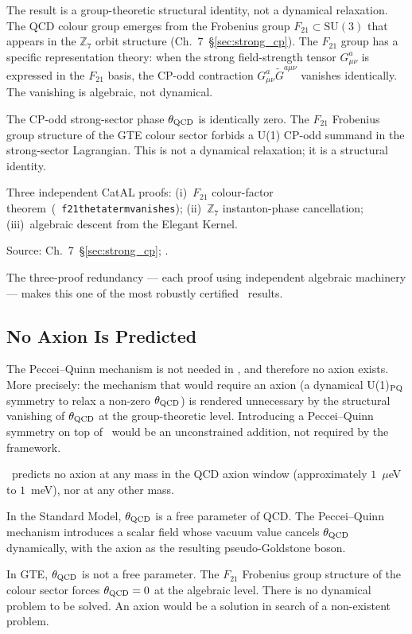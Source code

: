 \documentclass[11pt,openany]{book}
\theoremstyle{remark}
\newcommand{\GTE}{\text{GTE}}
\newcommand{\ZS}{\mathbb{Z}_7}
\newcommand{\lean}[1]{%
  \penalty-100
  \begingroup\def\_{\textunderscore\allowbreak}\texttt{#1}\endgroup}
\newcommand{\CatAL}{\ensuremath{\textbf{A}_{\rm Lean}}}
\begin{document}
The result is a group-theoretic structural identity, not a dynamical relaxation.  The
QCD colour group emerges from the Frobenius group $F_{21} \subset \mathrm{SU}(3)$ that
appears in the $\ZS$ orbit structure (Ch.~7~\S\ref{sec:strong_cp}).  The $F_{21}$ group
has a specific representation theory: when the strong field-strength tensor $G^a_{\mu\nu}$
is expressed in the $F_{21}$ basis, the CP-odd contraction $G^a_{\mu\nu}\tilde{G}^{a\mu\nu}$
vanishes identically.  The vanishing is algebraic, not dynamical.

\begin{tcolorbox}[colback=orange!5,colframe=orange!60,
  title={Result: $\theta_{\rm QCD} = 0$ Exactly (ROBUST \CatAL)}]
The CP-odd strong-sector phase $\theta_{\rm QCD}$ is identically zero.  The $F_{21}$
Frobenius group structure of the GTE colour sector forbids a U(1) CP-odd summand in
the strong-sector Lagrangian.  This is not a dynamical relaxation; it is a structural
identity.

Three independent CatAL proofs:
(i)~$F_{21}$ colour-factor theorem~\mbox{(\lean{f21\_theta\_term\_vanishes})};
(ii)~$\ZS$ instanton-phase cancellation;
(iii)~algebraic descent from the Elegant Kernel.

Source: Ch.~7~\S\ref{sec:strong_cp}; \cite{SpivackGTEQCDStructure}.
\end{tcolorbox}

The three-proof redundancy --- each proof using independent algebraic machinery ---
makes this one of the most robustly certified \GTE\ results.

\subsection*{No Axion Is Predicted}

The Peccei--Quinn mechanism is not needed in \GTE, and therefore no axion exists.
More precisely: the mechanism that would require an axion (a dynamical U(1)$_{\rm PQ}$
symmetry to relax a non-zero $\theta_{\rm QCD}$) is rendered unnecessary by the
structural vanishing of $\theta_{\rm QCD}$ at the group-theoretic level.  Introducing
a Peccei--Quinn symmetry on top of \GTE\ would be an unconstrained addition, not
required by the framework.

\GTE\ predicts no axion at any mass in the QCD axion window (approximately
$1$~$\mu$eV to $1$~meV), nor at any other mass.

\begin{tcolorbox}[colback=yellow!8,colframe=yellow!60!black,
  title={Why No Axion?  The Group-Theoretic Argument}]
In the Standard Model, $\theta_{\rm QCD}$ is a free parameter of QCD.  The Peccei--Quinn
mechanism introduces a scalar field whose vacuum value cancels $\theta_{\rm QCD}$
dynamically, with the axion as the resulting pseudo-Goldstone boson.

In GTE, $\theta_{\rm QCD}$ is not a free parameter.  The $F_{21}$ Frobenius group
structure of the colour sector forces $\theta_{\rm QCD} = 0$ at the algebraic level.
There is no dynamical problem to be solved.  An axion would be a solution in search of
a non-existent problem.
\end{tcolorbox}
\end{document}
